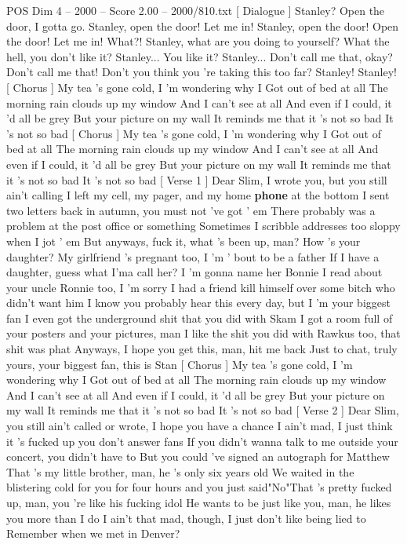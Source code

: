 \begin{textsample}{POS Dim 4 – 2000 – Score 2.00 – 2000/810.txt}  \label{ex:f4_pos_020}
[ Dialogue ] Stanley?
Open the door, I gotta go.
Stanley, open the door!
Let me in!
Stanley, open the door!
Open the door!
Let me in!
What?!
Stanley, what are you doing to yourself?
What the hell, you don't like it?
Stanley...
You like it?
Stanley...
Don't call me that, okay?
Don't call me that!
Don't you think you 're taking this too far?
Stanley!
Stanley! [ Chorus ] My tea 's gone cold, I 'm wondering why I Got out of bed at all The morning rain clouds up my window And I can't see at all And even if I could, it 'd all be grey But your picture on my wall It reminds me that it 's not so bad It 's not so bad [ Chorus ] My tea 's gone cold, I 'm wondering why I Got out of bed at all The morning rain clouds up my window And I can't see at all And even if I could, it 'd all be grey But your picture on my wall It reminds me that it 's not so bad It 's not so bad [ Verse 1 ] Dear Slim, I wrote you, but you still ain't calling I left my cell, my pager, and my home \textbf{phone} at the bottom I sent two letters back in autumn, you must not 've got ' em There probably was a problem at the post office or something Sometimes I scribble addresses too sloppy when I jot ' em But anyways, fuck it, what 's been up, man?
How 's your daughter?
My girlfriend 's pregnant too, I 'm ' bout to be a father If I have a daughter, guess what I'ma call her?
I 'm gonna name her Bonnie I read about your uncle Ronnie too, I 'm sorry I had a friend kill himself over some bitch who didn't want him I know you probably hear this every day, but I 'm your biggest fan I even got the underground shit that you did with Skam I got a room full of your posters and your pictures, man I like the shit you did with Rawkus too, that shit was phat Anyways, I hope you get this, man, hit me back Just to chat, truly yours, your biggest fan, this is Stan [ Chorus ] My tea 's gone cold, I 'm wondering why I Got out of bed at all The morning rain clouds up my window And I can't see at all And even if I could, it 'd all be grey But your picture on my wall It reminds me that it 's not so bad It 's not so bad [ Verse 2 ] Dear Slim, you still ain't called or wrote, I hope you have a chance I ain't mad, I just think it 's fucked up you don't answer fans If you didn't wanna talk to me outside your concert, you didn't have to But you could 've signed an autograph for Matthew That 's my little brother, man, he 's only six years old We waited in the blistering cold for you for four hours and you just said"No"That 's pretty fucked up, man, you 're like his fucking idol He wants to be just like you, man, he likes you more than I do I ain't that mad, though, I just don't like being lied to Remember when we met in Denver?

\end{textsample}
